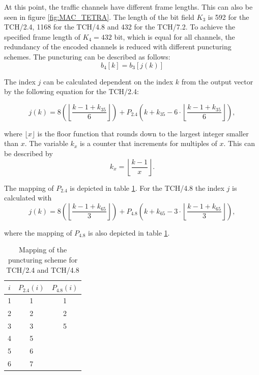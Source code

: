 At this point, the traffic channels have different frame lengths. This can also be seen in figure \ref{fig:MAC_TETRA}. The length of the bit field $K_3$ is 592 for the TCH/2.4, 1168 for the TCH/4.8 and 432 for the TCH/7.2. To achieve the specified frame length of $K_4 = 432$ bit, which is equal for all channels, the redundancy of the encoded channels is reduced with different puncturing schemes. The puncturing can be described as follows:
\begin{equation}
b_4[k] = b_3[j(k)]
\label{eq:pun}
\end{equation}

The index $j$ can be calculated dependent on the index $k$ from the output vector by the following equation for the TCH/2.4: 

\begin{equation}
	j(k) = 8\left(\left\lfloor \frac{k-1+k_{35}}{6}\right\rfloor \right)+ P_{2.4} \left( k+k_{35} - 6 \cdot \left\lfloor \frac{k-1+k_{35}}{6}\right\rfloor\right),
\end{equation}

where $\lfloor x \rfloor$ is the floor function that rounds down to the largest integer smaller than $x$. The variable $k_x$ is a counter that increments for multiples of $x$. This can be described by
\begin{equation}
k_x = \left\lfloor \frac{k-1}{x}\right\rfloor.
\end{equation}

The mapping of $P_{2.4}$ is depicted in table \ref{tab:Punct_TCH}. For the TCH/4.8 the index $j$ is calculated with
\begin{equation}
	j(k) = 8\left(\left\lfloor \frac{k-1+k_{65}}{3}\right\rfloor \right) + P_{4.8} \left( k+k_{65} - 3 \cdot \left\lfloor \frac{k-1+k_{65}}{3}\right\rfloor\right),
\end{equation}

where the mapping of $P_{4.8}$ is also depicted in table \ref{tab:Punct_TCH}.

\begin{table}[h]
	\centering
		\begin{tabular}{c|c|c}
		\toprule
			$i$ & $P_{2.4}(i)$ & $P_{4.8}(i)$ \\
		\midrule
			1 & 1			& 1 \\
			2 & 2			& 2 \\
			3 & 3			& 5 \\
			4 &	5			&   \\
			5 &	6			&   \\
			6 &	7			&   \\
			\bottomrule
		\end{tabular}
		\caption{Mapping of the puncturing scheme for TCH/2.4 and TCH/4.8}
		\label{tab:Punct_TCH}
\end{table}

